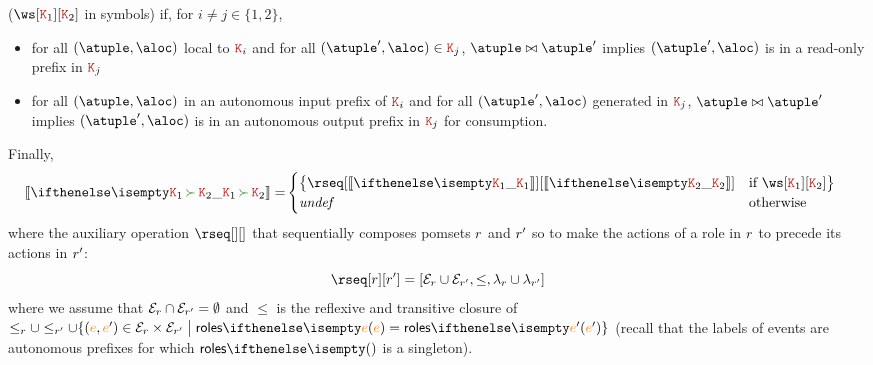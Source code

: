 ($\ws[\aK_1][\aK_2]$ in symbols) if, for $i \neq j \in \{1,2\}$,
%
\begin{itemize}
\item for all $(\atuple,\aloc)$ local to $\aK_i$ and for all
  $(\atuple', \aloc) \in \aK_j$, $\atuple \matches \atuple'$ implies
  $(\atuple', \aloc)$ is in a read-only prefix in $\aK_j$
\item for all $(\atuple,\aloc)$ in an autonomous input prefix of
  $\aK_i$ and for all $(\atuple', \aloc)$ generated in $\aK_j$,
  $\atuple \matches \atuple'$ implies $(\atuple',\aloc)$ is in an
  autonomous output prefix in $\aK_j$ for consumption.
\end{itemize}
%
Finally,
\begin{align*}
  \ksem{\aK_1 \seqop \aK_2} =
  &
    \begin{cases}
      \big\{
      \rseq[\ksem{\aK_1}][\ksem{\aK_2}] & \text{if } \ws[\aK_1][\aK_2]
      \big\}
      \\
      \mathit{undef} & \text{otherwise}
    \end{cases}
\end{align*}
where the auxiliary operation $\rseq[][]$ that sequentially composes
pomsets $r$ and $r'$ so to make the actions of a role in
$r$ to precede its actions in $r'$:
\[
  \rseq[\apom][\apom'] = 
  [\esetof{\apom} \cup \esetof{\apom'},
  \leq,
  \alfof{\apom} \cup \alfof{\apom'}]
\]
where we assume that $\mathcal{E}_{r} \cap \mathcal{E}_{r'} = \emptyset$
and $\leq$ is the reflexive and transitive closure of
$\leqof \apom \cup \leqof{\apom'} \cup \{(\ae,\ae') \in \esetof \apom
\times \esetof{\apom'} \sst \roles{\ae} = \roles{\ae'}\}$ (recall that
the labels of events are autonomous prefixes for which $\roles{}$ is a
singleton).
%
%
%
%
%


